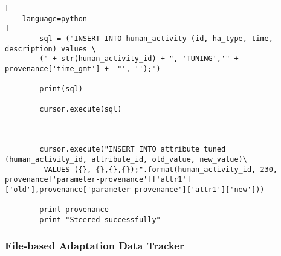 \begin{lstlisting}[
    language=python
]
        sql = ("INSERT INTO human_activity (id, ha_type, time, description) values \
        (" + str(human_activity_id) + ", 'TUNING','" + provenance['time_gmt'] +  "', '');")

        print(sql)

        cursor.execute(sql)



        cursor.execute("INSERT INTO attribute_tuned (human_activity_id, attribute_id, old_value, new_value)\
         VALUES ({}, {},{},{});".format(human_activity_id, 230, provenance['parameter-provenance']['attr1']['old'],provenance['parameter-provenance']['attr1']['new']))

        print provenance
        print "Steered successfully"

\end{lstlisting}



\subsubsection{File-based Adaptation Data Tracker}

